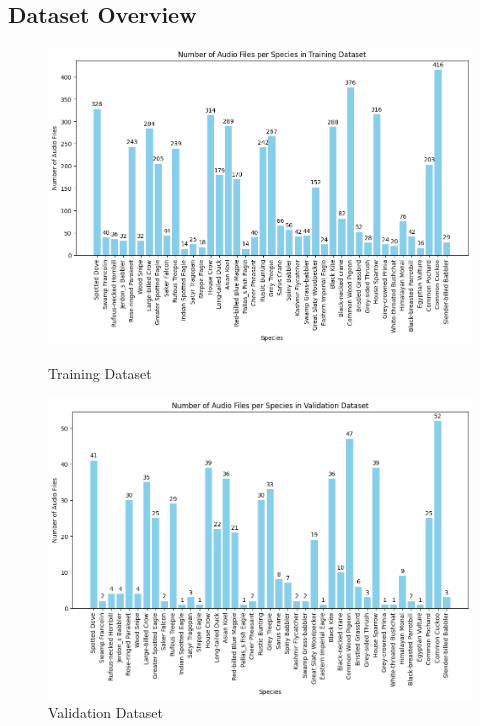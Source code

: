 \subsection{Dataset Overview}
    \begin{figure}[h]
        \centering
        \begin{minipage}[b]{0.45\linewidth}
            \includegraphics[width=\linewidth]{images/TrainingDataset.png}
            \caption{Training Dataset}
        \end{minipage}
        \hspace{1cm}
        \begin{minipage}[b]{0.45\linewidth}
            \includegraphics[width=\linewidth]{images/ValidationDataset.png}
            \caption{Validation Dataset}
        \end{minipage}
        
    \end{figure}
